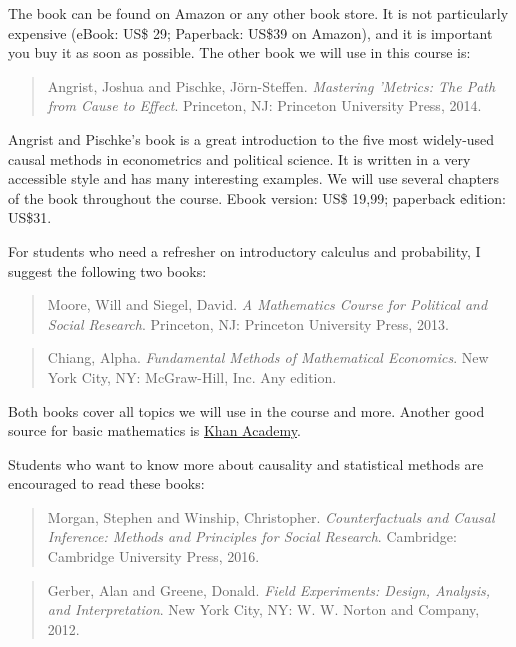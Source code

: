 \documentclass[a4paper,12pt]{article}
\begin{document}
The book can be found on Amazon or any other book store. It is not particularly expensive (eBook: US\$ 29; Paperback: US\$39 on Amazon), and it is important you buy it as soon as possible. The other book we will use in this course is:

\begin{quote}
Angrist, Joshua and Pischke, J\"{o}rn-Steffen. \textit{Mastering 'Metrics: The Path from Cause to Effect}. Princeton, NJ: Princeton University Press, 2014.
\end{quote}

Angrist and Pischke's book is a great introduction to the five most widely-used causal methods in econometrics and political science. It is written in a very accessible style and has many interesting examples. We will use several chapters of the book throughout the course. Ebook version: US\$ 19,99; paperback edition: US\$31.

For students who need a refresher on introductory calculus and probability, I suggest the following two books: 

\begin{quote}
Moore, Will and Siegel, David. \textit{A Mathematics Course for Political and Social Research}. Princeton, NJ: Princeton University Press, 2013.
\end{quote}

\begin{quote}
Chiang, Alpha. \textit{Fundamental Methods of Mathematical Economics}. New York City, NY: McGraw-Hill, Inc. Any edition.  
\end{quote}

Both books cover all topics we will use in the course and more. Another good source for basic mathematics is \href{https://www.khanacademy.org/}{Khan Academy}.

Students who want to know more about causality and statistical methods are encouraged to read these books:

\begin{quote}
Morgan, Stephen and Winship, Christopher. \textit{Counterfactuals and Causal Inference: Methods and Principles for Social Research}. Cambridge: Cambridge University Press, 2016. 
\end{quote}

\begin{quote}
Gerber, Alan and Greene, Donald. \textit{Field Experiments: Design, Analysis, and Interpretation}. New York City, NY: W. W. Norton and Company, 2012. 
\end{quote}
\end{document}
